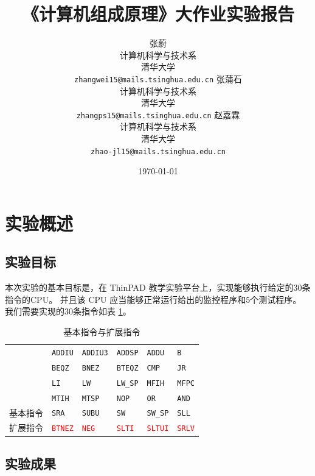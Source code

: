 \documentclass{article}
\title{《计算机组成原理》大作业实验报告}
\author{
    张蔚\\
    计算机科学与技术系\\
    清华大学\\
    \texttt{zhangwei15@mails.tsinghua.edu.cn}
    \And
    张蒲石\\
    计算机科学与技术系\\
    清华大学\\
    \texttt{zhangps15@mails.tsinghua.edu.cn}
    \And
    赵嘉霖\\
    计算机科学与技术系\\
    清华大学\\
    \texttt{zhao-jl15@mails.tsinghua.edu.cn}
}
\date{\today}
\begin{document}
\maketitle
\tableofcontents
\newpage
{} %

\section{实验概述}

\subsection{实验目标}

本次实验的基本目标是，在 ThinPAD 教学实验平台上，实现能够执行给定的$30$条指令的CPU。
并且该 CPU 应当能够正常运行给出的监控程序和$5$个测试程序。
我们需要实现的$30$条指令如表 \ref{tab:instruction}。
\begin{table}[ht]
\centering
\caption{基本指令与扩展指令}
\label{tab:instruction}
\begin{tabular}{|c|l|l|l|l|l|}
\hline
& \texttt{ADDIU} & \texttt{ADDIU3} & \texttt{ADDSP}  & \texttt{ADDU} & \texttt{B}    \\ \cline{2-6}
& \texttt{BEQZ}  & \texttt{BNEZ}   & \texttt{BTEQZ}  & \texttt{CMP}  & \texttt{JR}   \\ \cline{2-6}
& \texttt{LI}    & \texttt{LW}     & \texttt{LW\_SP} & \texttt{MFIH} & \texttt{MFPC} \\ \cline{2-6}
& \texttt{MTIH}  & \texttt{MTSP}   & \texttt{NOP}    & \texttt{OR}   & \texttt{AND}  \\ \cline{2-6}
\multirow{-5}{*}{基本指令} & \texttt{SRA} & \texttt{SUBU} & \texttt{SW} & \texttt{SW\_SP} & \texttt{SLL} \\ \hline
扩展指令 & \textcolor{red}{\texttt{BTNEZ}} & \textcolor{red}{\texttt{NEG}} & \textcolor{red}{\texttt{SLTI}} & \textcolor{red}{\texttt{SLTUI}} & \textcolor{red}{\texttt{SRLV}} \\ \hline
\end{tabular}
\end{table}

\subsection{实验成果}
\end{document}
